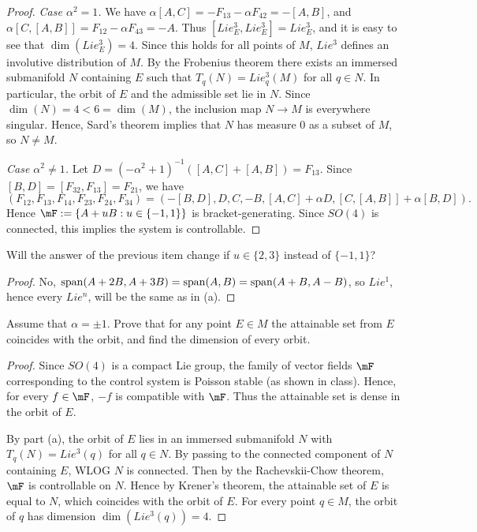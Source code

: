 \documentclass{article}
\begin{document}
\begin{proof}
\emph{Case $\alpha^2 = 1$.} We have $\alpha [A,C] = -F_{13} - \alpha F_{42} = - [A,B]$, and $\alpha [C, [A,B]] = F_{12} - \alpha F_{43} = -A$.
Thus $[Lie^3_E, Lie^3_E] = Lie^3_E$, and it is easy to see that $\dim(Lie^3_E) = 4$. Since this holds for all points of $M$, $Lie^3$ defines an involutive distribution of $M$.  By the Frobenius theorem there exists an immersed submanifold $N$ containing $E$ such that $T_q(N) = Lie^3_q(M)$ for all $q \in N$.  In particular, the orbit of $E$ and the admissible set lie in $N$. Since $\dim(N) = 4 < 6 = \dim(M)$,  the inclusion map $N \to M$ is everywhere singular. Hence, Sard's theorem implies that $N$ has measure $0$ as a subset of $M$, so $N \neq M$. 

\emph{Case $\alpha^2 \neq 1$.}
Let $D = (-\alpha^2 + 1)^{-1}([A, C] + [A, B]) = F_{13}$.  
Since $[B, D]  = [F_{32}, F_{13}] =  F_{21}$,
 we have
$$(F_{12}, F_{13}, F_{14}, F_{23}, F_{24}, F_{34}) = (-[B,D], D, C, -B, [A,C] + \alpha D, [C, [A,B]] + \alpha [B,D]).$$
Hence $\mF := \{A + uB : u \in \{-1, 1\}\}$  is bracket-generating. Since $SO(4)$ is connected, this implies the system is controllable.
\end{proof}

 Will the answer of the previous item change if $u \in \{2,3\}$ instead of $\{-1,1\}$?
\begin{proof}
No, $\operatorname{span}(A + 2B, A + 3B) = \operatorname{span}(A, B) = \operatorname{span}(A + B, A - B)$, so $Lie^1$, hence every $Lie^n$, will be the same as in (a). 
\end{proof}

 Assume that $\alpha = \pm 1$. Prove that for any point $E \in M$  the attainable set from $E$ coincides with the orbit, and find the dimension of every orbit.
\begin{proof}
Since $SO(4)$ is a compact Lie group, the family of vector fields $\mF$ corresponding to the control system is Poisson stable (as shown in class).  Hence, for every $f \in \mF$, $-f$ is compatible with $\mF$.  Thus the attainable set is dense in the orbit of $E$. 

By part (a), the orbit of $E$ lies in an immersed submanifold $N$ with $T_q(N) = Lie^3(q)$ for all $q \in N$. By passing to the connected component of $N$ containing $E$, WLOG $N$ is connected.  Then by the Rachevskii-Chow theorem, $\mF$ is controllable on $N$.  Hence by Krener's theorem, the attainable set of $E$ is equal to $N$, which coincides with the orbit of $E$.  For every point $q \in M$, the orbit of $q$ has dimension $\dim(Lie^3(q)) = 4$.
\end{proof}
\end{document}
